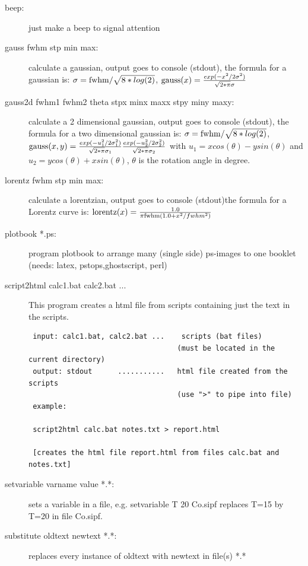 \begin{description}
\item [\prg beep:] just make a beep to signal attention 
\item [\prg gauss fwhm stp min max:] calculate a gaussian, output goes to console %
(stdout), the formula for a gaussian is:
$\sigma={\rm fwhm}/\sqrt{8*log(2)}$,
${\rm gauss}(x)=\frac{exp(-x^2/2 \sigma^2)}{\sqrt{2*\pi}\sigma}$
\item [\prg gauss2d fwhm1 fwhm2 theta  stpx minx maxx stpy miny maxy:] calculate a 2 dimensional gaussian, output goes to console %
(stdout), the formula for a two dimensional gaussian is:
$\sigma={\rm fwhm}/\sqrt{8*log(2)}$,
${\rm gauss}(x,y)=\frac{exp(-u_1^2/2 \sigma_1^2)}{\sqrt{2*\pi}\sigma_1}\frac{exp(-u_2^2/2 \sigma_2^2)}{\sqrt{2*\pi}\sigma_2}$ with $u_1=x cos(\theta)-ysin(\theta)$ and $u_2=y cos(\theta)+xsin(\theta)$,
$\theta$ is the rotation angle in degree.
\item [\prg lorentz fwhm stp min max:] calculate a lorentzian, output goes to %
console (stdout)the formula for a Lorentz curve is: 
${\rm lorentz}(x)=\frac{1.0}{\pi{\rm fwhm}(1.0+x^2/fwhm^2)}$
\item [\prg plotbook *.ps:] program plotbook to arrange many (single side) ps-images to one %
booklet (needs: latex, pstops,ghostscript, perl)
\item [\prg script2html calc1.bat calc2.bat ...] This program creates a html file from scripts containing just the text
 in the scripts.
\begin{verbatim}
 input: calc1.bat, calc2.bat ...    scripts (bat files)
                                   (must be located in the current directory)
 output: stdout      ...........   html file created from the scripts
                                   (use ">" to pipe into file)
 example:

 script2html calc.bat notes.txt > report.html

 [creates the html file report.html from files calc.bat and notes.txt]
\end{verbatim}
\item [\prg setvariable varname value *.*:]
sets a variable in a file, e.g. {\prg setvariable T 20 Co.sipf} replaces
T=15 by T=20 in file {\prg Co.sipf}.
\item [\prg substitute oldtext newtext *.*:] replaces every instance of %
oldtext with newtext in file(s) *.*
\end{description}


